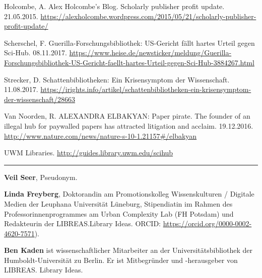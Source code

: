 \documentclass[a4paper,
fontsize=11pt,
oneside,
numbers=noperiodatend,
parskip=half-,
bibliography=totoc,
final
]{scrartcl}
\begin{document}
Holcombe, A. Alex Holcombe's Blog. Scholarly publisher profit update.
21.05.2015.
\url{https://alexholcombe.wordpress.com/2015/05/21/scholarly-publisher-profit-update/}

Scherschel, F. Guerilla-Forschungsbibliothek: US-Gericht fällt hartes
Urteil gegen Sci-Hub. 08.11.2017.
\url{https://www.heise.de/newsticker/meldung/Guerilla-Forschungsbibliothek-US-Gericht-faellt-hartes-Urteil-gegen-Sci-Hub-3884267.html}

Strecker, D. Schattenbibliotheken: Ein Krisensymptom der Wissenschaft.
11.08.2017.
\url{https://irights.info/artikel/schattenbibliotheken-ein-krisensymptom-der-wissenschaft/28663}

Van Noorden, R. ALEXANDRA ELBAKYAN: Paper pirate. The founder of an
illegal hub for paywalled papers has attracted litigation and acclaim.
19.12.2016.
\url{http://www.nature.com/news/nature-s-10-1.21157\#/elbakyan}

UWM Libraries. \url{http://guides.library.uwm.edu/scihub}

\begin{center}\rule{0.5\linewidth}{\linethickness}\end{center}

\textbf{Veil Seer}, Pseudonym.

\textbf{Linda Freyberg}, Doktorandin am Promotionskolleg Wissenskulturen
/ Digitale Medien der Leuphana Universität Lüneburg, Stipendiatin im
Rahmen des Professorinnenprogrammes am Urban Complexity Lab (FH Potsdam)
und Redakteurin der LIBREAS.Library Ideas. ORCID:
\url{https://orcid.org/0000-0002-4620-7571}).

\textbf{Ben Kaden} ist wissenschaftlicher Mitarbeiter an der
Universitätsbibliothek der Hum\-boldt-Uni\-ver\-si\-tät zu Berlin. Er ist
Mitbegründer und -herausgeber von LIBREAS. Library Ideas.
\end{document}
